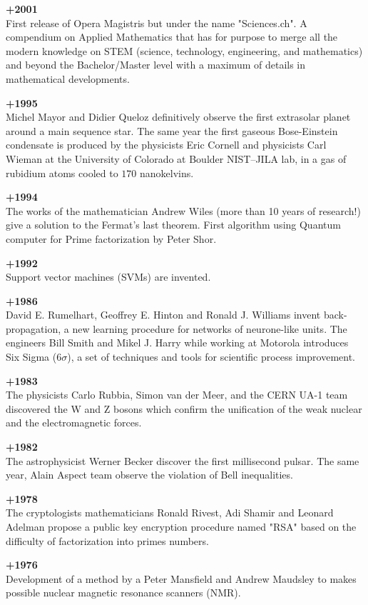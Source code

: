 \textbf{+2001}\\
First release of Opera Magistris but under the name "Sciences.ch". A compendium on Applied Mathematics that has for purpose to merge all the modern knowledge on STEM (science, technology, engineering, and mathematics) and beyond the Bachelor/Master level with a maximum of details in mathematical developments.

\textbf{+1995}\\
Michel Mayor and Didier Queloz definitively observe the first extrasolar planet around a main sequence star. The same year the first gaseous Bose-Einstein condensate is produced by the physicists Eric Cornell and physicists Carl Wieman at the University of Colorado at Boulder NIST–JILA lab, in a gas of rubidium atoms cooled to $170$ nanokelvins.

\textbf{+1994}\\
The works of the mathematician Andrew Wiles (more than 10 years of research!) give a solution to the Fermat's last theorem. First algorithm using Quantum computer for Prime factorization by Peter Shor.

\textbf{+1992}\\
Support vector machines (SVMs) are invented.

\textbf{+1986}\\
David E. Rumelhart, Geoffrey E. Hinton and Ronald J. Williams invent back-propagation, a new learning procedure for networks of neurone-like units. The engineers Bill Smith and Mikel J. Harry while working at Motorola introduces Six Sigma ($6\sigma$), a set of techniques and tools for scientific process improvement.

\textbf{+1983}\\
The physicists Carlo Rubbia, Simon van der Meer, and the CERN UA-1 team discovered the W and Z bosons which confirm the unification of the weak nuclear and the electromagnetic forces.

\textbf{+1982}\\
The astrophysicist Werner Becker discover the first millisecond pulsar. The same year, Alain Aspect team observe the violation of Bell inequalities.

\textbf{+1978}\\
The cryptologists mathematicians Ronald Rivest, Adi Shamir and Leonard Adelman propose a public key encryption procedure named "RSA" based on the difficulty of factorization into primes numbers.

\textbf{+1976}\\
Development of a method by a Peter Mansfield and Andrew Maudsley to makes possible nuclear magnetic resonance scanners (NMR).

